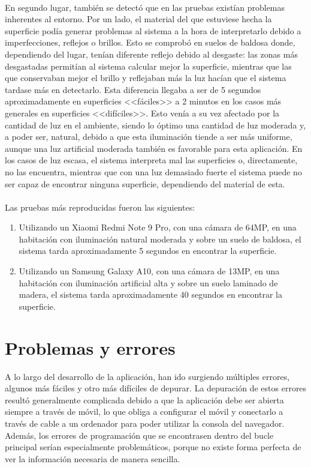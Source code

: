 \documentclass{subfiles}
\begin{document}
    \paragraph{}
    En segundo lugar, también se detectó que en las pruebas existían problemas inherentes al entorno. Por un lado, el material del que estuviese hecha la superficie podía generar problemas al sistema a la hora de interpretarlo debido a imperfecciones, reflejos o brillos. Esto se comprobó en suelos de baldosa donde, dependiendo del lugar, tenían diferente reflejo debido al desgaste: las zonas más desgastadas permitían al sistema calcular mejor la superficie, mientras que las que conservaban mejor el brillo y reflejaban más la luz hacían que el sistema tardase más en detectarlo. Esta diferencia llegaba a ser de 5 segundos aproximadamente en superficies <<fáciles>> a 2 minutos en los casos más generales en superficies <<difíciles>>. Esto venía a su vez afectado por la cantidad de luz en el ambiente, siendo lo óptimo una cantidad de luz moderada y, a poder ser, natural, debido a que esta iluminación tiende a ser más uniforme, aunque una luz artificial moderada también es favorable para esta aplicación. En los casos de luz escasa, el sistema interpreta mal las superficies o, directamente, no las encuentra, mientras que con una luz demasiado fuerte el sistema puede no ser capaz de encontrar ninguna superficie, dependiendo del material de esta.

    \paragraph{}
    Las pruebas más reproducidas fueron las siguientes:
    \begin{enumerate}
        \item Utilizando un Xiaomi Redmi Note 9 Pro, con una cámara de 64MP, en una habitación con iluminación natural moderada y sobre un suelo de baldosa, el sistema tarda aproximadamente 5 segundos en encontrar la superficie.
        \item Utilizando un Samsung Galaxy A10, con una cámara de 13MP, en una habitación con iluminación artificial alta y sobre un suelo laminado de madera, el sistema tarda aproximadamente 40 segundos en encontrar la superficie.
    \end{enumerate}

    \section{Problemas y errores}
    \label{sec:problemas_y_errores}
    A lo largo del desarrollo de la aplicación, han ido surgiendo múltiples errores, algunos más fáciles y otro más difíciles de depurar. La depuración de estos errores resultó generalmente complicada debido a que la aplicación debe ser abierta siempre a través de móvil, lo que obliga a configurar el móvil y conectarlo a través de cable a un ordenador para poder utilizar la consola del navegador. Además, los errores de programación que se encontrasen dentro del bucle principal serían especialmente problemáticos, porque no existe forma perfecta de ver la información necesaria de manera sencilla.
\end{document}
